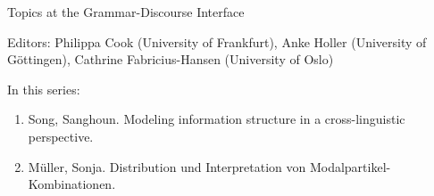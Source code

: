 {\large  Topics at the Grammar-Discourse Interface}

\bigskip

Editors: Philippa Cook (University of Frankfurt),
Anke Holler (University of Göttingen),
Cathrine Fabricius-Hansen (University of Oslo)

\bigskip

In this series:

\begin{enumerate}
\item Song, Sanghoun. Modeling information structure in a cross-linguistic perspective.
\item Müller, Sonja. Distribution und Interpretation von Modalpartikel-Kombinationen.
\end{enumerate}

 
